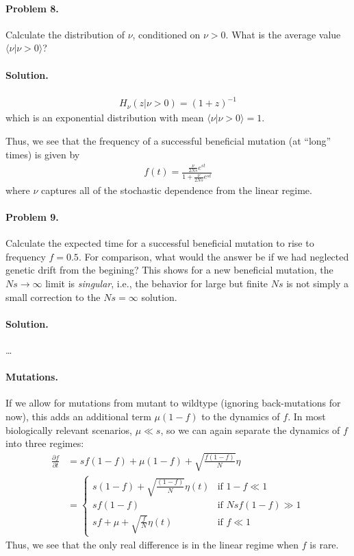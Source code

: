 \documentclass[11pt]{article}
\begin{document}
\paragraph{Problem 8.} Calculate the distribution of $\nu$, conditioned on $\nu > 0$. What is the average value $\langle \nu | \nu > 0 \rangle$?

\paragraph{Solution.}

\begin{align}
H_{\nu}(z|\nu>0) = \left( 1 + z \right)^{-1}
\end{align}
which is an exponential distribution with mean $\langle \nu | \nu > 0 \rangle = 1$. 

\noindent \newline Thus, we see that the frequency of a successful beneficial mutation (at ``long'' times) is given by
\begin{align}
f(t) = \frac{\frac{\nu}{2Ns} e^{st}}{1+\frac{\nu}{2Ns} e^{st}}
\end{align}
where $\nu$ captures all of the stochastic dependence from the linear regime. 

\paragraph{Problem 9.} Calculate the expected time for a successful beneficial mutation to rise to frequency $f=0.5$. For comparison, what would the answer be if we had neglected genetic drift from the begining? This shows for a new beneficial mutation, the $Ns \to \infty$ limit is \emph{singular}, i.e., the behavior for large but finite $Ns$ is not simply a small correction to the $Ns = \infty$ solution.  

\paragraph{Solution.} \ldots

\paragraph{Mutations.} If we allow for mutations from mutant to wildtype (ignoring back-mutations for now), this adds an additional term $\mu(1-f)$ to the dynamics of $f$. In most biologically relevant scenarios, $\mu \ll s$, so we can again separate the dynamics of $f$ into three regimes:
\begin{align}
\frac{\partial f}{\partial t} & = s f(1-f) + \mu(1-f) + \sqrt{\frac{f(1-f)}{N}} \eta \\
	& = \begin{cases} 
	s(1-f)+\sqrt{\frac{(1-f)}{N}} \eta(t) & \text{if $1-f \ll 1$} \\
	sf(1-f) & \text{if $Ns f(1-f) \gg 1$} \\
	sf+\mu+\sqrt{\frac{f}{N}} \eta(t) & \text{if $f \ll 1$}
	\end{cases}
\end{align}
Thus, we see that the only real difference is in the linear regime when $f$ is rare. 
\end{document}
